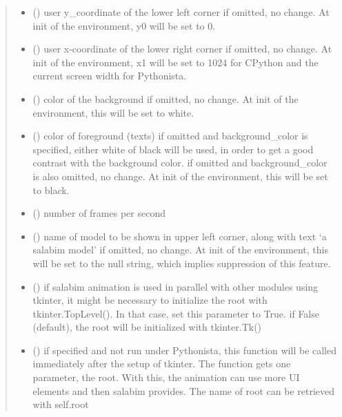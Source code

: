 \documentclass[letterpaper,10pt,english]{sphinxmanual}
\begin{document}
\begin{fulllineitems}
\begin{fulllineitems}
\begin{quote}
\begin{description}
\begin{itemize}
\item {} 
 () \textendash{} user y\_coordinate of the lower left corner 
if omitted, no change. At init of the environment, y0 will be set to 0.

\item {} 
 () \textendash{} user x-coordinate of the lower right corner 
if omitted, no change. At init of the environment, x1 will be set to 1024
for CPython and the current screen width for Pythonista.

\item {} 
 () \textendash{} color of the background 
if omitted, no change. At init of the environment, this will be set to white.

\item {} 
 () \textendash{} color of foreground (texts) 
if omitted and background\_color is specified, either white of black will be used,
in order to get a good contrast with the background color. 
if omitted and background\_color is also omitted, no change. At init of the
environment, this will be set to black.

\item {} 
 () \textendash{} number of frames per second

\item {} 
 () \textendash{} name of model to be shown in upper left corner,
along with text ‘a salabim model’ 
if omitted, no change. At init of the environment, this will be set
to the null string, which implies suppression of this feature.

\item {} 
 () \textendash{} if salabim animation is used in parallel with
other modules using tkinter, it might be necessary to
initialize the root with tkinter.TopLevel().
In that case, set this parameter to True. 
if False (default), the root will be initialized with tkinter.Tk()

\item {} 
 (\sphinxstyleliteralemphasis{ (}\sphinxstyleliteralemphasis{)}) \textendash{} if specified and not run under Pythonista, this function will be called immediately
after the setup of tkinter. The function gets one parameter, the root. 
With this, the animation can use more UI elements and then salabim provides. 
The name of root can be retrieved with self.root


\end{itemize}
\end{description}
\end{quote}
\end{fulllineitems}
\end{fulllineitems}
\end{document}
